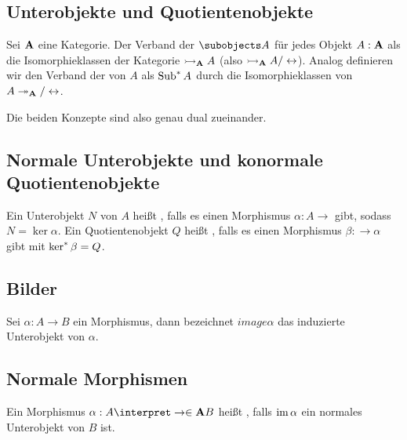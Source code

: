 \subsection{Unterobjekte und Quotientenobjekte}

\begin{definition}
    Sei $\mathbf{A}$ eine Kategorie. Der Verband der  $\subobjects A$ für jedes Objekt $A:\mathbf{A}$ als die
    Isomorphieklassen der Kategorie $\rightarrowtail_{\mathbf{A}} A$ (also $\rightarrowtail_{\mathbf{A}} A/\leftrightarrow$).
    Analog definieren wir den Verband der  von $A$ als $\mathop{{\mathrm{Sub}}^{\ast}} A$ durch die Isomorphieklassen von $A\twoheadrightarrow_{\mathbf{A}}/\leftrightarrow$.
\end{definition}

\begin{remark}
    Die beiden Konzepte sind also genau dual zueinander.
\end{remark}

\subsection{Normale Unterobjekte und konormale Quotientenobjekte}

\begin{definition}
        Ein Unterobjekt $N$ von $A$ heißt , falls es einen Morphismus $\alpha:A\to$ gibt, sodass $N=\ker\alpha$.
        Ein Quotientenobjekt $Q$ heißt , falls es einen Morphismus $\beta:\to\alpha$ gibt mit $\mathop{{\mathrm{ker}}^{\ast}} \beta=Q$.
\end{definition}

\subsection{Bilder}

\begin{definition}
    Sei $\alpha:A\to B$ ein Morphismus, dann bezeichnet $image \alpha$ das induzierte Unterobjekt von $\alpha$.
\end{definition}

\subsection{Normale Morphismen}

\begin{definition}
    Ein Morphismus $\alpha:A\interpret\to\in\bfA B$ heißt , falls $\mathop{\mathrm{im}}\alpha$ ein
    normales Unterobjekt von $B$ ist.
\end{definition}

